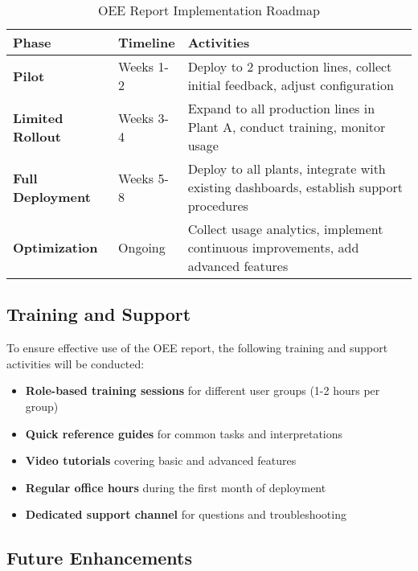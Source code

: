 \documentclass[11pt,a4paper]{article}
\begin{document}
\begin{table}[H]
    \centering
    \begin{tabular}{>{\bfseries}p{2.5cm}p{3.5cm}p{5.5cm}}
        \toprule
        \textbf{Phase} & \textbf{Timeline} & \textbf{Activities} \\
        \midrule
        Pilot & Weeks 1-2 & Deploy to 2 production lines, collect initial feedback, adjust configuration \\
        \addlinespace
        Limited Rollout & Weeks 3-4 & Expand to all production lines in Plant A, conduct training, monitor usage \\
        \addlinespace
        Full Deployment & Weeks 5-8 & Deploy to all plants, integrate with existing dashboards, establish support procedures \\
        \addlinespace
        Optimization & Ongoing & Collect usage analytics, implement continuous improvements, add advanced features \\
        \bottomrule
    \end{tabular}
    \caption{OEE Report Implementation Roadmap}
    \label{tab:roadmap}
\end{table}

\subsection{Training and Support}

To ensure effective use of the OEE report, the following training and support activities will be conducted:

\begin{itemize}
    \item \textbf{Role-based training sessions} for different user groups (1-2 hours per group)
    \item \textbf{Quick reference guides} for common tasks and interpretations
    \item \textbf{Video tutorials} covering basic and advanced features
    \item \textbf{Regular office hours} during the first month of deployment
    \item \textbf{Dedicated support channel} for questions and troubleshooting
\end{itemize}

\subsection{Future Enhancements}
\end{document}
